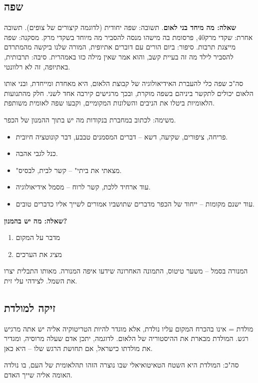 \documentclass[a4paper]{book}
\begin{document}
	\subsection{שפה}
	\textbf{שאלה: מה מיחד בני לאום}. תשובה: שפה יחודית (לדוגמה קיצורים של צופים). תשובה אחרת: שקדי מרק40, פרסומת בה מישהו מנסה להסביר מה מיוחד בשקדי מרק. מסקנה: שפה מייצגת תרבות. סיפור: ביום הורים עם דוברים אתיופית, המורה שלנו ביקשה מהמתרדם להסביר לילד מה זה בעיית קשב, והוא אמר שאין מילה כזו באמהרית. סיבה: תרבותית, באתיופה, זה לא רלוונטי. 
	
	סה"כ שפה כלי להעברת האידיאולוגיה של קבוצת הלאום, היא מאחדת ומייחדת, ובני אותו הלאום יכולים לתקשר ביניהם בשפה מוקרת, ובכך מרגישים קירבה אחד לשני. חלק מהתנועות הלאומיות ביטלו את הניבים והשלונות המקומיים, וקבעו שפה לאומית משותפת. 
	
	משימה: לכתוב במחברת בנקודות מה יש בתוך ההמנון של הכפר. 
	\begin{itemize}
		\item פריחה, ציפורים, שקיעה, דשא – דברים המסמנים טבבע, דבר קונוטציה חיובית. 
		\item כנל לגבי אהבה. 
		\item "מצאתי את ביתי" – קשר לבית, לבסיס. 
		\item עוד ארחיד ללכת, קשר לרוח – מסמל אידיאולוגיה. 
		\item עוד ישנם מקומות – ייחוד של הכפר מדברים שתושביו אמורים לשייך אליו כדברים טובים. 
	\end{itemize}
	
	\textbf{שאלה: מה יש בהמנון?}
	
	\begin{enumerate}
		\item מדבר על המקום
		\item מציג את הערכים
	\end{enumerate}
	
	המנורה בסמל – משער טיטוס, התמונה האחרונה שידעו איפה המנורה. מאותו התבלית יצרו את השמל. לצידהי עלי זית. 
	
	\subsection{זיקה למולדת}
	מולדת = אינו בהכרח המקום עליו נולדת, אלא מוגדר להיות הטריטוקיה אליה יש אתה מרגיש רגש. המולדת מבארת את ההיסטוריה של הלאום. לדוגמה, יתכן אדם שעלה מרוסיה, ומגדיר את מולדתו כישראל, אם תחושת הרגש שלו – היא כאן. 
	
	סה"כ: המולדת היא השטח הטאיטואיאלי שבו נוצרה הזהו תהלאומית של העם, בו נולדה האומה אליה שייך האדם. 
	
\end{document}
